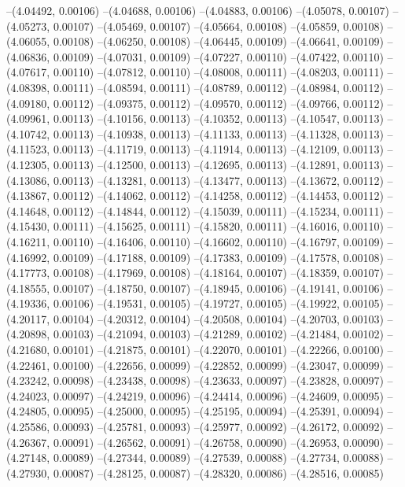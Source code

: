 --(4.04492, 0.00106)
--(4.04688, 0.00106)
--(4.04883, 0.00106)
--(4.05078, 0.00107)
--(4.05273, 0.00107)
--(4.05469, 0.00107)
--(4.05664, 0.00108)
--(4.05859, 0.00108)
--(4.06055, 0.00108)
--(4.06250, 0.00108)
--(4.06445, 0.00109)
--(4.06641, 0.00109)
--(4.06836, 0.00109)
--(4.07031, 0.00109)
--(4.07227, 0.00110)
--(4.07422, 0.00110)
--(4.07617, 0.00110)
--(4.07812, 0.00110)
--(4.08008, 0.00111)
--(4.08203, 0.00111)
--(4.08398, 0.00111)
--(4.08594, 0.00111)
--(4.08789, 0.00112)
--(4.08984, 0.00112)
--(4.09180, 0.00112)
--(4.09375, 0.00112)
--(4.09570, 0.00112)
--(4.09766, 0.00112)
--(4.09961, 0.00113)
--(4.10156, 0.00113)
--(4.10352, 0.00113)
--(4.10547, 0.00113)
--(4.10742, 0.00113)
--(4.10938, 0.00113)
--(4.11133, 0.00113)
--(4.11328, 0.00113)
--(4.11523, 0.00113)
--(4.11719, 0.00113)
--(4.11914, 0.00113)
--(4.12109, 0.00113)
--(4.12305, 0.00113)
--(4.12500, 0.00113)
--(4.12695, 0.00113)
--(4.12891, 0.00113)
--(4.13086, 0.00113)
--(4.13281, 0.00113)
--(4.13477, 0.00113)
--(4.13672, 0.00112)
--(4.13867, 0.00112)
--(4.14062, 0.00112)
--(4.14258, 0.00112)
--(4.14453, 0.00112)
--(4.14648, 0.00112)
--(4.14844, 0.00112)
--(4.15039, 0.00111)
--(4.15234, 0.00111)
--(4.15430, 0.00111)
--(4.15625, 0.00111)
--(4.15820, 0.00111)
--(4.16016, 0.00110)
--(4.16211, 0.00110)
--(4.16406, 0.00110)
--(4.16602, 0.00110)
--(4.16797, 0.00109)
--(4.16992, 0.00109)
--(4.17188, 0.00109)
--(4.17383, 0.00109)
--(4.17578, 0.00108)
--(4.17773, 0.00108)
--(4.17969, 0.00108)
--(4.18164, 0.00107)
--(4.18359, 0.00107)
--(4.18555, 0.00107)
--(4.18750, 0.00107)
--(4.18945, 0.00106)
--(4.19141, 0.00106)
--(4.19336, 0.00106)
--(4.19531, 0.00105)
--(4.19727, 0.00105)
--(4.19922, 0.00105)
--(4.20117, 0.00104)
--(4.20312, 0.00104)
--(4.20508, 0.00104)
--(4.20703, 0.00103)
--(4.20898, 0.00103)
--(4.21094, 0.00103)
--(4.21289, 0.00102)
--(4.21484, 0.00102)
--(4.21680, 0.00101)
--(4.21875, 0.00101)
--(4.22070, 0.00101)
--(4.22266, 0.00100)
--(4.22461, 0.00100)
--(4.22656, 0.00099)
--(4.22852, 0.00099)
--(4.23047, 0.00099)
--(4.23242, 0.00098)
--(4.23438, 0.00098)
--(4.23633, 0.00097)
--(4.23828, 0.00097)
--(4.24023, 0.00097)
--(4.24219, 0.00096)
--(4.24414, 0.00096)
--(4.24609, 0.00095)
--(4.24805, 0.00095)
--(4.25000, 0.00095)
--(4.25195, 0.00094)
--(4.25391, 0.00094)
--(4.25586, 0.00093)
--(4.25781, 0.00093)
--(4.25977, 0.00092)
--(4.26172, 0.00092)
--(4.26367, 0.00091)
--(4.26562, 0.00091)
--(4.26758, 0.00090)
--(4.26953, 0.00090)
--(4.27148, 0.00089)
--(4.27344, 0.00089)
--(4.27539, 0.00088)
--(4.27734, 0.00088)
--(4.27930, 0.00087)
--(4.28125, 0.00087)
--(4.28320, 0.00086)
--(4.28516, 0.00085)
